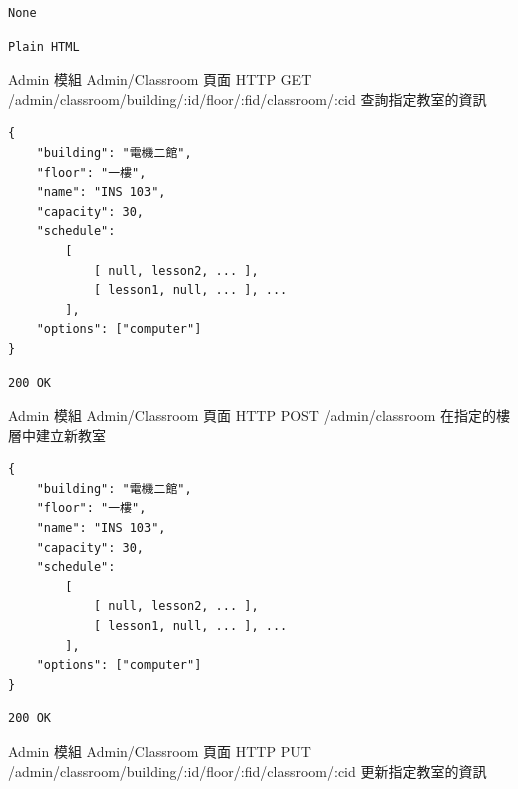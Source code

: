 \documentclass{article}
\begin{document}
\begin{lrbox}{\jsoninputbox}
	\begin{lstlisting}
None
\end{lstlisting}
\end{lrbox}

\begin{lrbox}{\jsonoutputbox}
	\begin{lstlisting}
Plain HTML
\end{lstlisting}
\end{lrbox}

{Admin 模組}
{Admin/Classroom 頁面}
{HTTP GET}
{/admin/classroom/building/:id/floor/:fid/classroom/:cid}
{查詢指定教室的資訊}

\bigskip

\begin{lrbox}{\jsoninputbox}
	\begin{lstlisting}[basicstyle=\tiny\ttfamily]
{
	"building": "電機二館",
	"floor": "一樓",
	"name": "INS 103",
	"capacity": 30,
	"schedule":
		[
			[ null, lesson2, ... ],
			[ lesson1, null, ... ], ... 
		],
	"options": ["computer"]
}
\end{lstlisting}
\end{lrbox}

\begin{lrbox}{\jsonoutputbox}
	\begin{lstlisting}
200 OK
\end{lstlisting}
\end{lrbox}

{Admin 模組}
{Admin/Classroom 頁面}
{HTTP POST}
{/admin/classroom}
{在指定的樓層中建立新教室}

\bigskip

\begin{lrbox}{\jsoninputbox}
	\begin{lstlisting}[basicstyle=\tiny\ttfamily]
{
	"building": "電機二館",
	"floor": "一樓",
	"name": "INS 103",
	"capacity": 30,
	"schedule":
		[
			[ null, lesson2, ... ],
			[ lesson1, null, ... ], ... 
		],
	"options": ["computer"]
}
\end{lstlisting}
\end{lrbox}

\begin{lrbox}{\jsonoutputbox}
	\begin{lstlisting}
200 OK
\end{lstlisting}
\end{lrbox}

{Admin 模組}
{Admin/Classroom 頁面}
{HTTP PUT}
{/admin/classroom/building/:id/floor/:fid/classroom/:cid}
{更新指定教室的資訊}
\end{document}
